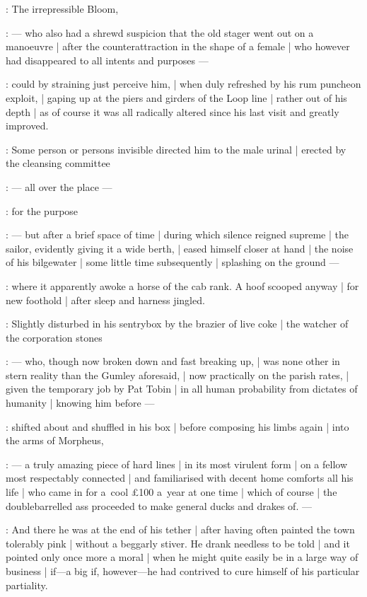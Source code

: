 :
The irrepressible Bloom,

:
    --- who also had a shrewd suspicion
        that the old stager went out on a manoeuvre |
        after the counterattraction in the shape of a female |
        who however had disappeared to all intents and purposes ---

:
could by straining just perceive him, |
when duly refreshed by his rum puncheon exploit, |
gaping up at the piers and girders of the Loop line |
rather out of his depth |
as of course it was all radically altered
since his last visit and greatly improved.

:
Some person or persons invisible
directed him to the male urinal |
erected by the cleansing committee

:
    --- all over the place ---

:
for the purpose

:
    --- but after a brief space of time |
        during which silence reigned supreme |
        the sailor, evidently giving it a wide berth, |
        eased himself closer at hand |
        the noise of his bilgewater |
        some little time subsequently |
        splashing on the ground ---

:
where it apparently awoke a horse of the cab rank.
A hoof scooped anyway |
for new foothold |
after sleep and harness jingled.

:
Slightly disturbed in his sentrybox
by the brazier of live coke |
the watcher of the corporation stones

:
    --- who, though now broken down and fast breaking up, |
        was none other in stern reality than the Gumley aforesaid, |
        now practically on the parish rates, |
        given the temporary job by Pat Tobin |
        in all human probability from dictates of humanity |
        knowing him before  ---

:
shifted about and shuffled in his box |
before composing his limbs again |
into the arms of Morpheus,

:
    --- a truly amazing piece of hard lines |
        in its most virulent form |
        on a fellow most respectably connected |
        and familiarised with decent home comforts all his life |
        who came in for a~cool £100 a~year at one time |
        which of course |
        the doublebarrelled ass proceeded to make general ducks and drakes of. ---

:
And there he was at the end of his tether |
after having often painted the town tolerably pink |
without a beggarly stiver.
He drank needless to be told |
and it pointed only once more a moral |
when he might quite easily be in a large way of business |
if---a big if, however---he had contrived to cure himself
of his particular partiality.

